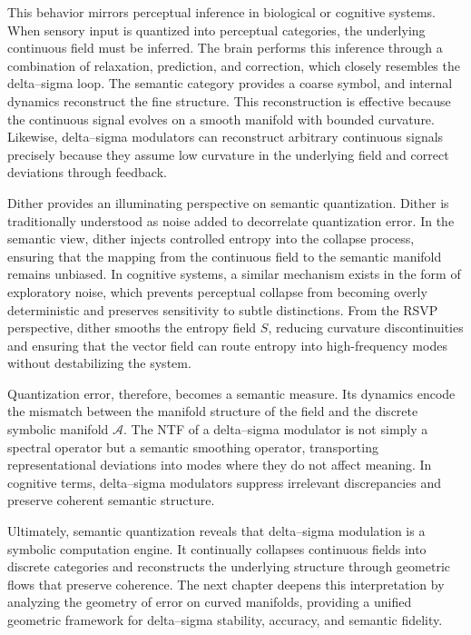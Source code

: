 This behavior mirrors perceptual inference in biological or cognitive systems. When sensory input is quantized into perceptual categories, the underlying continuous field must be inferred. The brain performs this inference through a combination of relaxation, prediction, and correction, which closely resembles the delta–sigma loop. The semantic category provides a coarse symbol, and internal dynamics reconstruct the fine structure. This reconstruction is effective because the continuous signal evolves on a smooth manifold with bounded curvature. Likewise, delta–sigma modulators can reconstruct arbitrary continuous signals precisely because they assume low curvature in the underlying field and correct deviations through feedback.

Dither provides an illuminating perspective on semantic quantization. Dither is traditionally understood as noise added to decorrelate quantization error. In the semantic view, dither injects controlled entropy into the collapse process, ensuring that the mapping from the continuous field to the semantic manifold remains unbiased. In cognitive systems, a similar mechanism exists in the form of exploratory noise, which prevents perceptual collapse from becoming overly deterministic and preserves sensitivity to subtle distinctions. From the RSVP perspective, dither smooths the entropy field \(S\), reducing curvature discontinuities and ensuring that the vector field can route entropy into high-frequency modes without destabilizing the system.

Quantization error, therefore, becomes a semantic measure. Its dynamics encode the mismatch between the manifold structure of the field and the discrete symbolic manifold \(\mathcal{A}\). The NTF of a delta–sigma modulator is not simply a spectral operator but a semantic smoothing operator, transporting representational deviations into modes where they do not affect meaning. In cognitive terms, delta–sigma modulators suppress irrelevant discrepancies and preserve coherent semantic structure.

Ultimately, semantic quantization reveals that delta–sigma modulation is a symbolic computation engine. It continually collapses continuous fields into discrete categories and reconstructs the underlying structure through geometric flows that preserve coherence. The next chapter deepens this interpretation by analyzing the geometry of error on curved manifolds, providing a unified geometric framework for delta–sigma stability, accuracy, and semantic fidelity.


